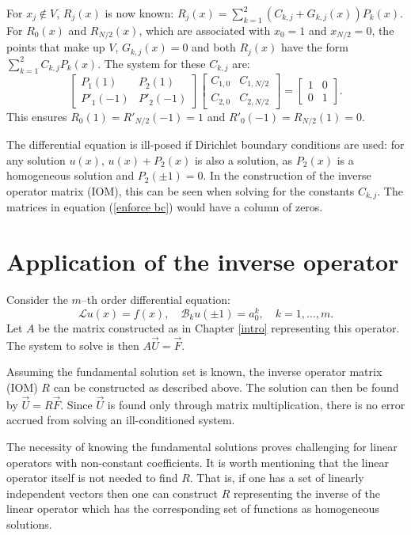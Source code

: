 \documentclass{sfuthesis}
\begin{document}
For $x_j \notin V$, $R_j(x)$ is now known: $R_j(x) = \sum_{k=1}^2 (C_{k,j} + G_{k,j}(x)) P_k(x)$.
For $R_0(x)$ and $R_{N/2}(x)$, which are associated with $x_0 = 1$ and $x_{N/2} = 0$, the points that make up $V$,
$G_{k,j}(x) = 0$ and both $R_j(x)$ have the form $\sum_{k=1}^2 C_{k,j} P_k(x)$.
The system for these $C_{k,j}$ are:
\begin{equation}
\begin{bmatrix} P_1(1) & P_2(1) \\ P'_1(-1) & P'_2(-1) \end{bmatrix}
\begin{bmatrix} C_{1,0} & C_{1,N/2}\\ C_{2,0} & C_{2,N/2} \end{bmatrix} =
\begin{bmatrix} 1 & 0 \\ 0 & 1 \end{bmatrix} .
\end{equation}
This ensures $R_0(1) = R'_{N/2}(-1) = 1$ and $R'_0(-1) = R_{N/2}(1) = 0$.

The differential equation is ill-posed if Dirichlet boundary conditions are used:
for any solution $u(x)$, $u(x) + P_2(x)$ is also a solution, as $P_2(x)$ is a homogeneous solution and $P_2(\pm1) = 0$.
In the construction of the inverse operator matrix (IOM), this can be seen when solving for the constants $C_{k,j}$.
The matrices in equation (\ref{enforce bc}) would have a column of zeros.

\section{Application of the inverse operator}

Consider the $m$--th order differential equation:
\begin{equation}
\mathcal{L}u(x) = f(x), \quad \mathcal{B}_k u(\pm 1) = a_0^k, \quad k = 1,...,m .
\end{equation}
Let $A$ be the matrix constructed as in Chapter \ref{intro} representing this operator.
The system to solve is then $A \vec{U} = \vec{F}$.

Assuming the fundamental solution set is known, the inverse operator matrix (IOM) $R$ can be constructed as described above.
The solution can then be found by $\vec{U} = R \vec{F}$.
Since $\vec{U}$ is found only through matrix multiplication, there is no error accrued from solving an ill-conditioned system.

The necessity of knowing the fundamental solutions proves challenging for linear operators with non-constant coefficients.
It is worth mentioning that the linear operator itself is not needed to find $R$.
That is, if one has a set of linearly independent vectors then one can construct $R$ representing the inverse of the linear operator which has the corresponding set of functions as homogeneous solutions.
\end{document}
